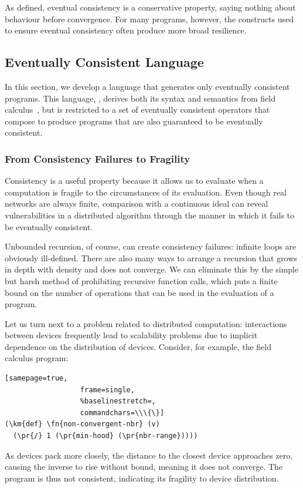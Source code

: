 \documentclass[12pt,a4paper,twoside,openright]{book}
\begin{document}
As defined, eventual consistency is a conservative property, saying nothing about behaviour before convergence.
%
For many programs, however, the constructs used to ensure eventual consistency often produce more broad resilience.

\subsection{Eventually Consistent Language}

In this section, we develop a language that generates only eventually consistent programs.
%
This language, \calculus{}, derives both its syntax and semantics from field calculus~\cite{VDB-FOCLASA-CIC2013}, but is restricted to a set of eventually consistent operators that compose to produce programs that are also guaranteed to be eventually consistent.

\subsubsection{From Consistency Failures to Fragility}

Consistency is a useful property because it allows us to evaluate when a computation is fragile to the circumstances of its evaluation.
%
Even though real networks are always finite, comparison with a continuous ideal can reveal vulnerabilities in a distributed algorithm through the manner in which it fails to be eventually consistent.

Unbounded recursion, of course, can create consistency failures: infinite loops are obviously ill-defined.  There are also many ways to arrange a recursion that grows in depth with density and does not converge.
%
We can eliminate this by the simple but harsh method of prohibiting recursive function calls, which puts a finite bound on the number of operations that can be used in the evaluation of a program.

Let us turn next to a problem related to distributed computation: interactions between devices frequently lead to scalability problems due to implicit dependence on the distribution of devices.
%
Consider, for example, the field calculus program:
\begin{samepage}
\begin{Verbatim}[samepage=true,
                  frame=single,
                  %baselinestretch=,
                  commandchars=\\\{\}]
(\km{def} \fn{non-convergent-nbr} (v)
  (\pr{/} 1 (\pr{min-hood} (\pr{nbr-range}))))
\end{Verbatim}
\end{samepage}
As devices pack more closely, the distance to the closest device approaches zero, causing the inverse to rise without bound, meaning it does not converge.  The program is thus not consistent, indicating its fragility to device distribution.
\end{document}
